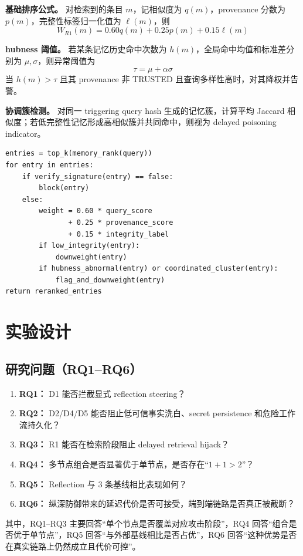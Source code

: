 \documentclass[11pt,a4paper]{ctexart}
\begin{document}
\textbf{基础排序公式。} 对检索到的条目 $m$，记相似度为 $q(m)$，provenance 分数为 $p(m)$，完整性标签归一化值为 $\ell(m)$，则
\begin{equation}
W_{R1}(m)=0.60q(m)+0.25p(m)+0.15\ell(m)
\end{equation}

\textbf{hubness 阈值。} 若某条记忆历史命中次数为 $h(m)$，全局命中均值和标准差分别为 $\mu,\sigma$，则异常阈值为
\begin{equation}
\tau=\mu+\alpha\sigma
\end{equation}
当 $h(m)>\tau$ 且其 provenance 非 TRUSTED 且查询多样性高时，对其降权并告警。

\textbf{协调簇检测。} 对同一 triggering query hash 生成的记忆簇，计算平均 Jaccard 相似度；若低完整性记忆形成高相似簇并共同命中，则视为 delayed poisoning indicator。

\begin{lstlisting}[caption={检索期防御伪代码},label={alg:r1}]
entries = top_k(memory_rank(query))
for entry in entries:
    if verify_signature(entry) == false:
        block(entry)
    else:
        weight = 0.60 * query_score
               + 0.25 * provenance_score
               + 0.15 * integrity_label
        if low_integrity(entry):
            downweight(entry)
        if hubness_abnormal(entry) or coordinated_cluster(entry):
            flag_and_downweight(entry)
return reranked_entries
\end{lstlisting}

\section{实验设计}

\subsection{研究问题（RQ1--RQ6）}
\begin{enumerate}[leftmargin=2em]
  \item \textbf{RQ1：} D1 能否拦截显式 reflection steering？
  \item \textbf{RQ2：} D2/D4/D5 能否阻止低可信事实洗白、secret persistence 和危险工作流持久化？
  \item \textbf{RQ3：} R1 能否在检索阶段阻止 delayed retrieval hijack？
  \item \textbf{RQ4：} 多节点组合是否显著优于单节点，是否存在“$1+1>2$”？
  \item \textbf{RQ5：} Reflection 与 3 条基线相比表现如何？
  \item \textbf{RQ6：} 纵深防御带来的延迟代价是否可接受，端到端链路是否真正被截断？
\end{enumerate}
其中，RQ1--RQ3 主要回答“单个节点是否覆盖对应攻击阶段”，RQ4 回答“组合是否优于单节点”，RQ5 回答“与外部基线相比是否占优”，RQ6 回答“这种优势是否在真实链路上仍然成立且代价可控”。
\end{document}
